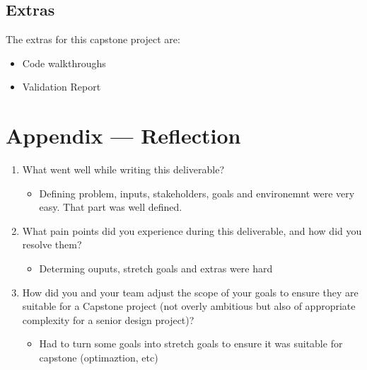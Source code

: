 \documentclass{article}
\begin{document}
\subsection{Extras}
The extras for this capstone project are:
\begin{itemize}
    \item Code walkthroughs
    \item Validation Report
\end{itemize}


\newpage{}

\section*{Appendix --- Reflection}



\begin{enumerate}
    \item What went well while writing this deliverable? 
    \begin{itemize}
        \item Defining problem, inputs, stakeholders, goals and environemnt were very easy. That part was well defined.
    \end{itemize}
    \item What pain points did you experience during this deliverable, and how
    did you resolve them?
    \begin{itemize}
        \item Determing ouputs, stretch goals and extras were hard
    \end{itemize}
        \item How did you and your team adjust the scope of your goals to ensure
    they are suitable for a Capstone project (not overly ambitious but also of
    appropriate complexity for a senior design project)?
    \begin{itemize}
        \item Had to turn some goals into stretch goals to ensure it was suitable for capstone (optimaztion, etc)
    \end{itemize}
\end{enumerate}  
\end{document}
